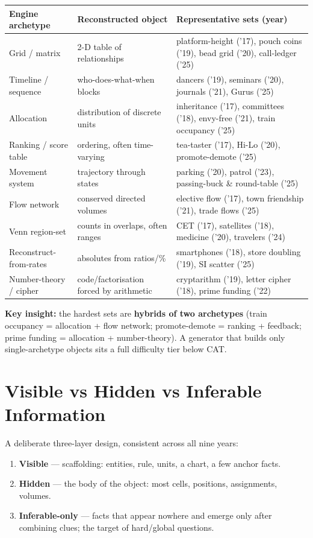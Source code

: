 \documentclass[11pt,a4paper]{article}
\begin{document}
\begin{center}
\begin{tabularx}{\textwidth}{lYY}
\toprule
\textbf{Engine archetype} & \textbf{Reconstructed object} & \textbf{Representative sets (year)} \\
\midrule
Grid / matrix & 2-D table of relationships & platform-height (’17), pouch coins (’19), bead grid (’20), call-ledger (’25) \\
Timeline / sequence & who-does-what-when blocks & dancers (’19), seminars (’20), journals (’21), Gurus (’25) \\
Allocation & distribution of discrete units & inheritance (’17), committees (’18), envy-free (’21), train occupancy (’25) \\
Ranking / score table & ordering, often time-varying & tea-taster (’17), Hi-Lo (’20), promote-demote (’25) \\
Movement system & trajectory through states & parking (’20), patrol (’23), passing-buck \& round-table (’25) \\
Flow network & conserved directed volumes & elective flow (’17), town friendship (’21), trade flows (’25) \\
Venn region-set & counts in overlaps, often ranges & CET (’17), satellites (’18), medicine (’20), travelers (’24) \\
Reconstruct-from-rates & absolutes from ratios/\% & smartphones (’18), store doubling (’19), SI scatter (’25) \\
Number-theory / cipher & code/factorisation forced by arithmetic & cryptarithm (’19), letter cipher (’18), prime funding (’22) \\
\bottomrule
\end{tabularx}
\end{center}

\textbf{Key insight:} the hardest sets are \textbf{hybrids of two archetypes} (train occupancy = allocation + flow network; promote-demote = ranking + feedback; prime funding = allocation + number-theory). A generator that builds only single-archetype objects sits a full difficulty tier below CAT.

\section{Visible vs Hidden vs Inferable Information}

A deliberate three-layer design, consistent across all nine years:
\begin{enumerate}[leftmargin=1.6em]
\item \textbf{Visible} --- scaffolding: entities, rule, units, a chart, a few anchor facts.
\item \textbf{Hidden} --- the body of the object: most cells, positions, assignments, volumes.
\item \textbf{Inferable-only} --- facts that appear nowhere and emerge only after combining clues; the target of hard/global questions.
\end{enumerate}
\end{document}
